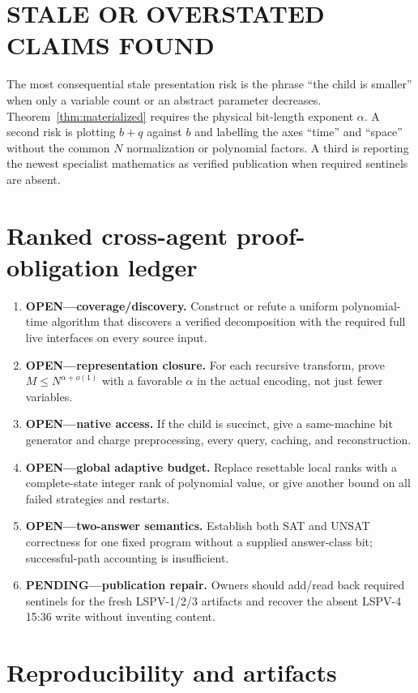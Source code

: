 \documentclass[11pt]{article}
\begin{document}
\section{STALE OR OVERSTATED CLAIMS FOUND}

The most consequential stale presentation risk is the phrase ``the child is smaller'' when only a
variable count or an abstract parameter decreases.  Theorem~\ref{thm:materialized} requires the
physical bit-length exponent $\alpha$.  A second risk is plotting $b+q$ against $b$ and labelling the
axes ``time'' and ``space'' without the common $N$ normalization or polynomial factors.  A third is
reporting the newest specialist mathematics as verified publication when required sentinels are absent.

\section{Ranked cross-agent proof-obligation ledger}

\begin{enumerate}
\item \textbf{OPEN---coverage/discovery.}  Construct or refute a uniform polynomial-time algorithm
that discovers a verified decomposition with the required full live interfaces on every source input.
\item \textbf{OPEN---representation closure.}  For each recursive transform, prove
$M\leq N^{\alpha+o(1)}$ with a favorable $\alpha$ in the actual encoding, not just fewer variables.
\item \textbf{OPEN---native access.}  If the child is succinct, give a same-machine bit generator and
charge preprocessing, every query, caching, and reconstruction.
\item \textbf{OPEN---global adaptive budget.}  Replace resettable local ranks with a complete-state
integer rank of polynomial value, or give another bound on all failed strategies and restarts.
\item \textbf{OPEN---two-answer semantics.}  Establish both SAT and UNSAT correctness for one fixed
program without a supplied answer-class bit; successful-path accounting is insufficient.
\item \textbf{PENDING---publication repair.}  Owners should add/read back required sentinels for the
fresh LSPV-1/2/3 artifacts and recover the absent LSPV-4 15:36 write without inventing content.
\end{enumerate}

\section{Reproducibility and artifacts}
\end{document}
